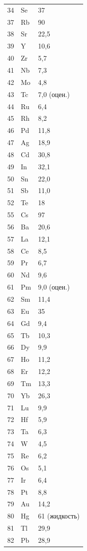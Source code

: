 \documentclass[12pt,a4paper]{article}
\begin{document}
\begin{longtable}{p{0.6cm}p{1.2cm}p{1.5cm}}
		34 & Se & 37 \\
		37 & Rb & 90 \\
		38 & Sr & 22,5 \\
		39 & Y  & 10,6 \\
		40 & Zr & 5,7 \\
		41 & Nb & 7,3 \\
		42 & Mo & 4,8 \\
		43 & Tc & 7,0 (оцен.) \\
		44 & Ru & 6,4 \\
		45 & Rh & 8,2 \\
		46 & Pd & 11,8 \\
		47 & Ag & 18,9 \\
		48 & Cd & 30,8 \\
		49 & In & 32,1 \\
		50 & Sn & 22,0 \\
		51 & Sb & 11,0 \\
		52 & Te & 18 \\
		55 & Cs & 97 \\
		56 & Ba & 20,6 \\
		57 & La & 12,1 \\
		58 & Ce & 8,5 \\
		59 & Pr & 6,7 \\
		60 & Nd & 9,6 \\
		61 & Pm & 9,0 (оцен.) \\
		62 & Sm & 11,4 \\
		63 & Eu & 35 \\
		64 & Gd & 9,4 \\
		65 & Tb & 10,3 \\
		66 & Dy & 9,9 \\
		67 & Ho & 11,2 \\
		68 & Er & 12,2 \\
		69 & Tm & 13,3 \\
		70 & Yb & 26,3 \\
		71 & Lu & 9,9 \\
		72 & Hf & 5,9 \\
		73 & Ta & 6,3 \\
		74 & W  & 4,5 \\
		75 & Re & 6,2 \\
		76 & Os & 5,1 \\
		77 & Ir & 6,4 \\
		78 & Pt & 8,8 \\
		79 & Au & 14,2 \\
		80 & Hg & 61 (жидкость) \\
		81 & Tl & 29,9 \\
		82 & Pb & 28,9 \\
	\end{longtable}
	
\end{document}
